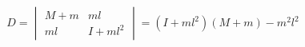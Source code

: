 \documentclass{article}
\begin{document}
\thispagestyle{empty}

$$
D = \begin{vmatrix}M+m & ml \\ ml & I+ml^2\end{vmatrix} = (I+ml^2)(M+m) - m^2l^2
$$
\end{document}
